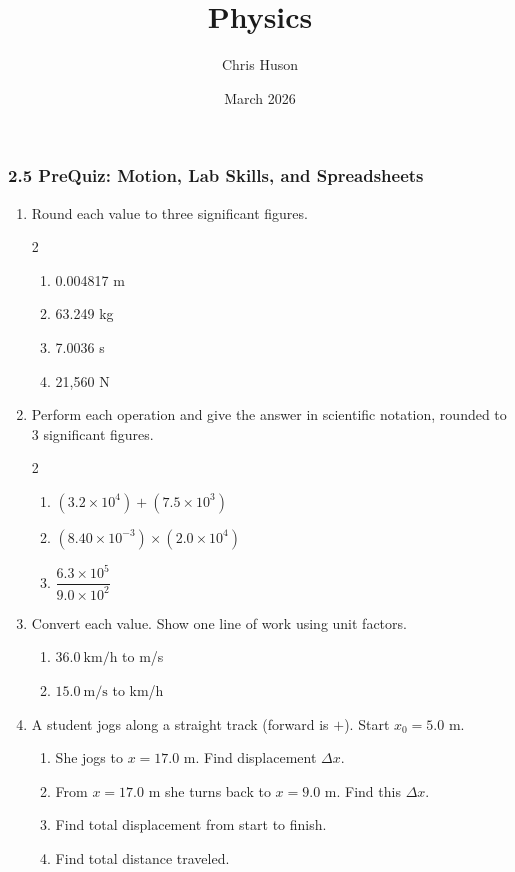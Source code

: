 \documentclass[12pt, twoside]{article}
\title{Physics}
\author{Chris Huson}
\date{March 2026}
\begin{document}
\subsubsection*{2.5 PreQuiz: Motion, Lab Skills, and Spreadsheets}

\begin{enumerate}[itemsep=0.5cm]

\item Round each value to three significant figures.
  \begin{multicols}{2}
  \begin{enumerate}[itemsep=0.5cm]
    \item 0.004817 m
    \item 63.249 kg
    \item 7.0036 s
    \item 21,560 N
  \end{enumerate}
  \end{multicols}
  \vspace{0.5cm}

\item Perform each operation and give the answer in scientific notation, rounded to 3 significant figures.
  \begin{multicols}{2}
  \begin{enumerate}[itemsep=1cm]
    \item $(3.2\times10^{4}) + (7.5\times10^{3})$
    \item $(8.40\times10^{-3}) \times (2.0\times10^{4})$
    \item $\dfrac{6.3\times10^{5}}{9.0\times10^{2}}$
  \end{enumerate}
  \end{multicols}
  \vspace{0.5cm}

\item Convert each value. Show one line of work using unit factors.
  \begin{enumerate}[itemsep=1.5cm]
    \item $36.0~\text{km/h}$ to m/s
    \item $15.0~\text{m/s}$ to km/h
  \end{enumerate}
  \vspace{0.5cm}

\item A student jogs along a straight track (forward is $+$). Start $x_0 = 5.0$ m.
  \begin{enumerate}[itemsep=0.5cm]
    \item She jogs to $x = 17.0$ m. Find displacement $\Delta x$.
    \item From $x=17.0$ m she turns back to $x=9.0$ m. Find this $\Delta x$.
    \item Find total displacement from start to finish.
    \item Find total distance traveled.
  \end{enumerate}


\end{enumerate}
\end{document}
